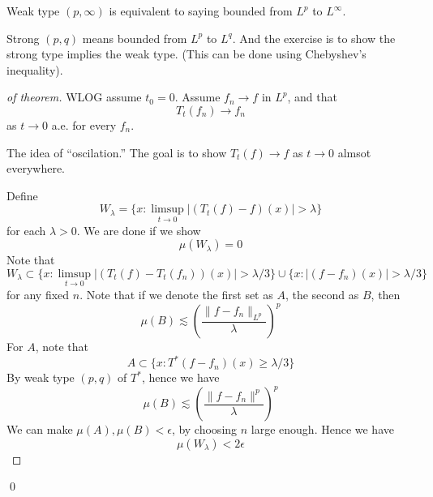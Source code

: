 \begin{exercise}
    Weak type $(p,\infty)$ is equivalent to saying bounded from $L^p$ to $L^\infty$.

    Strong $(p,q)$ means bounded from $L^p$ to $L^q$. And the exercise is to show the strong type implies the weak type. (This can be done using Chebyshev's inequality).
\end{exercise}

\begin{proof}[of theorem]
    WLOG assume $t_0=0$. Assume $f_n\to f$ in $L^p$, and that
    \begin{equation*}
        T_t(f_n)\to f_n
    \end{equation*}
    as $t\to 0$ a.e. for every $f_n$.

    The idea of ``oscilation.'' The goal is to show $T_t(f)\to f$ as $t\to 0$ almsot everywhere.

    Define
    \begin{equation*}
        W_\lambda=\{x: \limsup_{t\to 0}|(T_t(f)-f)(x)|>\lambda \}
    \end{equation*}
    for each $\lambda>0$. We are done if we show 
    \begin{equation*}
        \mu(W_\lambda)=0
    \end{equation*}
    Note that 
    \begin{equation*}
        W_\lambda\subset\{x:\limsup_{t\to 0}|(T_t(f)-T_t(f_n))(x)|>\lambda/3\}\cup \{x: |(f-f_n)(x)|>\lambda/3\}
    \end{equation*}
    for any fixed $n$. Note that if we denote the first set as $A$, the second as $B$, then 
    \begin{equation*}
        \mu(B)\lesssim \left(\frac{\|f-f_n\|_{L^p}}{\lambda} \right)^p
    \end{equation*}
    For $A$, note that 
    \begin{equation*}
        A\subset \{x: T^*(f-f_n)(x)\geq\lambda/3\}
    \end{equation*}
    By weak type $(p,q)$ of $T^*$, hence we have
    \begin{equation*}
        \mu(B)\lesssim \left(\frac{\|f-f_n\|^p}{\lambda} \right)^p
    \end{equation*}
    We can make $\mu(A), \mu(B)<\epsilon$, by choosing $n$ large enough. Hence we have
    \begin{equation*}
        \mu(W_\lambda)<2\epsilon
    \end{equation*}
\end{proof}
\qed

